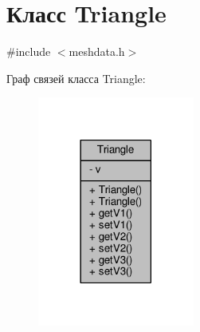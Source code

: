 \hypertarget{class_triangle}{}\section{Класс Triangle}
\label{class_triangle}


{\ttfamily \#include $<$meshdata.\+h$>$}



Граф связей класса Triangle\+:
\nopagebreak
\begin{figure}[H]
\begin{center}
\leavevmode
\includegraphics[width=146pt]{d4/df9/class_triangle__coll__graph}
\end{center}
\end{figure}
